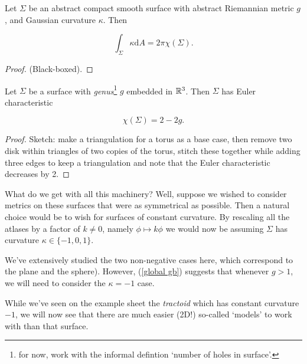\documentclass[11pt]{scrartcl}
\begin{document}
\begin{theorem}
\label{global gb}

Let $\Sigma$ be an abstract compact smooth surface with abstract Riemannian metric $g$, and Gaussian curvature $\kappa$. Then 

\begin{equation}
    \int_\Sigma \kappa \mathrm{d}A = 2 \pi \chi(\Sigma).
\end{equation}

\begin{proof}
(Black-boxed).
\end{proof}
\end{theorem}

\begin{proposition}
[Donuts!]

Let $\Sigma$ be a surface with \textit{genus}\footnote{for now, work with the informal defintion `number of holes in surface'.} $g$ embedded in $\mathbb R^3$. Then $\Sigma$ has Euler characteristic

\begin{equation}
    \chi(\Sigma) = 2 - 2g.
\end{equation}

\begin{proof}
Sketch: make a triangulation for a torus as a base case, then remove two disk within triangles of two copies of the torus, stitch these together while adding three edges to keep a triangulation and note that the Euler characteristic decreases by 2.
\end{proof}
\end{proposition}

What do we get with all this machinery? Well, suppose we wished to consider metrics on these surfaces that were as symmetrical as possible. Then a natural choice would be to wish for surfaces of constant curvature. By rescaling all the atlases by a factor of $k \neq 0$, namely $\phi \mapsto k \phi$ we would now be assuming $\Sigma$ has curvature $\kappa \in \{ -1, 0, 1 \}$.

We've extensively studied the two non-negative cases here, which correspond to the plane and the sphere). However, (\ref{global gb}) suggests that whenever $g > 1$, we will need to consider the $\kappa = -1$ case.

While we've seen on the example sheet the \textit{tractoid} which has constant curvature $-1$, we will now see that there are much easier (2D!) so-called `models' to work with than that surface.
\end{document}
